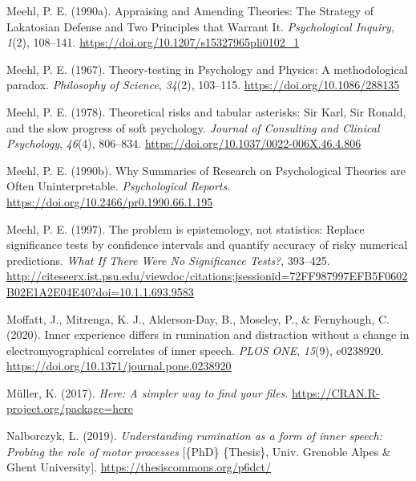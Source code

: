 \documentclass[
  man, donotrepeattitle,floatsintext]{apa6}
\newlength{\cslhangindent}
\newlength{\cslentryspacingunit} %
\newenvironment{CSLReferences}[2] %
 {%
  \setlength{\parindent}{0pt}
  \ifodd #1
  \let\oldpar\par
  \def\par{\hangindent=\cslhangindent\oldpar}
  \fi
  \setlength{\parskip}{#2\cslentryspacingunit}
 }%
 {}
\begin{document}
\begin{CSLReferences}{1}{0}
\leavevmode{}%
Meehl, P. E. (1990a). Appraising and {Amending} {Theories}: {The} {Strategy} of {Lakatosian} {Defense} and {Two} {Principles} that {Warrant} {It}. \emph{Psychological Inquiry}, \emph{1}(2), 108--141. \url{https://doi.org/10.1207/s15327965pli0102_1}

\leavevmode{}%
Meehl, P. E. (1967). Theory-testing in {Psychology} and {Physics}: {A} methodological paradox. \emph{Philosophy of Science}, \emph{34}(2), 103--115. \url{https://doi.org/10.1086/288135}

\leavevmode{}%
Meehl, P. E. (1978). Theoretical risks and tabular asterisks: {Sir} {Karl}, {Sir} {Ronald}, and the slow progress of soft psychology. \emph{Journal of Consulting and Clinical Psychology}, \emph{46}(4), 806--834. \url{https://doi.org/10.1037/0022-006X.46.4.806}

\leavevmode{}%
Meehl, P. E. (1990b). Why {Summaries} of {Research} on {Psychological} {Theories} are {Often} {Uninterpretable}. \emph{Psychological Reports}. \url{https://doi.org/10.2466/pr0.1990.66.1.195}

\leavevmode{}%
Meehl, P. E. (1997). The problem is epistemology, not statistics: {Replace} significance tests by confidence intervals and quantify accuracy of risky numerical predictions. \emph{What If There Were No Significance Tests?}, 393--425. \url{http://citeseerx.ist.psu.edu/viewdoc/citations;jsessionid=72FF987997EFB5F0602B02E1A2E04E40?doi=10.1.1.693.9583}

\leavevmode{}%
Moffatt, J., Mitrenga, K. J., Alderson-Day, B., Moseley, P., \& Fernyhough, C. (2020). Inner experience differs in rumination and distraction without a change in electromyographical correlates of inner speech. \emph{PLOS ONE}, \emph{15}(9), e0238920. \url{https://doi.org/10.1371/journal.pone.0238920}

\leavevmode{}%
Müller, K. (2017). \emph{Here: A simpler way to find your files}. \url{https://CRAN.R-project.org/package=here}

\leavevmode{}%
Nalborczyk, L. (2019). \emph{Understanding rumination as a form of inner speech: Probing the role of motor processes} {[}\{PhD\} \{Thesis\}, Univ. Grenoble Alpes \& Ghent University{]}. \url{https://thesiscommons.org/p6dct/}


\end{CSLReferences}
\end{document}
